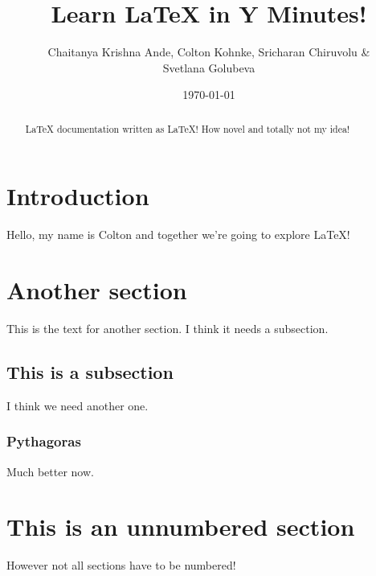 \documentclass[12pt]{article}
\author{Chaitanya Krishna Ande, Colton Kohnke, Sricharan Chiruvolu \& \\
Svetlana Golubeva}
\date{\today}
\title{Learn \LaTeX{} in Y Minutes!}
\begin{document}
\maketitle

\newpage
\tableofcontents

\newpage

\begin{abstract}
 \LaTeX{} documentation written as \LaTeX! How novel and totally not
 my idea!
\end{abstract}

\section{Introduction}
Hello, my name is Colton and together we're going to explore \LaTeX!

\section{Another section}
This is the text for another section. I think it needs a subsection.

\subsection{This is a subsection} %
I think we need another one.

\subsubsection{Pythagoras}
Much better now.
\label{subsec:pythagoras}

\section*{This is an unnumbered section}
However not all sections have to be numbered!
\end{document}
